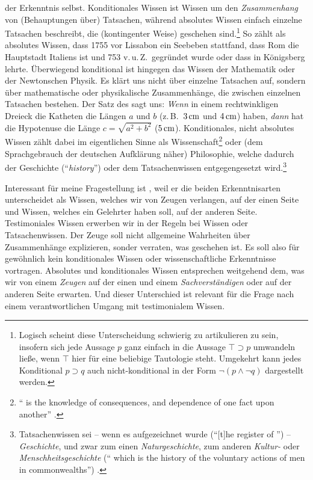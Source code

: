der Erkenntnis selbst. Konditionales Wissen ist Wissen um den
\emph{Zusammenhang} von (Behauptungen über) Tatsachen, während absolutes Wissen
einfach einzelne Tatsachen beschreibt, die (kontingenter Weise) geschehen
sind.\footnote{Logisch scheint diese Unterscheidung schwierig zu artikulieren zu
sein, insofern sich jede  Aussage $p$ ganz einfach in die
 Aussage $ \top \supset p$ umwandeln ließe, wenn $ \top $
hier für eine beliebige Tautologie steht. Umgekehrt kann jedes Konditional $p
\supset q$ auch nicht-konditional in der Form $\neg (p \land \neg q)$ dargestellt
werden.} So zählt als absolutes Wissen, dass 1755 vor Lissabon ein Seebeben
stattfand, dass Rom die Hauptstadt Italiens ist und 753 v.\,u.\,Z.\ gegründet wurde oder dass
 in Königsberg lehrte. Überwiegend konditional ist hingegen
das Wissen der Mathematik oder der Newtonschen Physik. Es klärt uns nicht über
einzelne Tatsachen auf, sondern über mathematische oder physikalische
Zusammenhänge, die zwischen einzelnen Tatsachen bestehen.
Der Satz des  sagt uns: \emph{Wenn} in einem
rechtwinkligen Dreieck die Katheten die Längen $a$ und $b$ (z.\,B.\ $\unit[3]{cm}$ und
$\unit[4]{cm}$) haben, \emph{dann} hat die Hypotenuse die Länge $c = \sqrt{a^2 +
b^2}$ ($\unit[5]{cm}$). Konditionales, nicht
absolutes Wissen zählt dabei im eigentlichen Sinne als
Wissenschaft\footnote{\enquote{ is the knowledge of consequences,
and dependence of one fact upon another}
\parencite[][35]{Hobbes:Leviathan1962}.} oder (dem Sprachgebrauch der deutschen
Aufklärung näher) Philosophie, welche dadurch der Geschichte
(\enquote{\emph{history}}) oder dem Tatsachenwissen entgegengesetzt
wird.\footnote{Tatsachenwissen sei --
wenn es aufgezeichnet wurde (\enquote{[t]he register of }) -- \emph{Geschichte}, und zwar zum einen \emph{Naturgeschichte}, zum
anderen \emph{Kultur-} oder \emph{Menschheitsgeschichte} (\enquote{
which is the history of the voluntary actions of men in commonwealths})
\parencite[vgl.][71]{Hobbes:Leviathan1962}.}

Interessant für meine Fragestellung ist , weil
er die beiden Erkenntnisarten unterscheidet als Wissen, welches wir von Zeugen
verlangen, auf der einen Seite und Wissen, welches ein Gelehrter haben soll, auf
der anderen Seite. Testimoniales Wissen erwerben wir in der Regeln bei
 Wissen oder Tatsachenwissen. Der Zeuge soll nicht allgemeine
Wahrheiten über Zusammenhänge explizieren, sonder verraten, was geschehen
ist. Es soll also für gewöhnlich kein konditionales Wissen oder
wissenschaftliche Erkenntnisse vortragen. Absolutes und
konditionales Wissen entsprechen weitgehend dem, was wir von einem \emph{Zeugen}
auf der einen und einem \emph{Sachverständigen} oder  auf
der anderen Seite erwarten. Und dieser Unterschied ist relevant für die Frage
nach einem verantwortlichen Umgang mit testimonialem Wissen.

